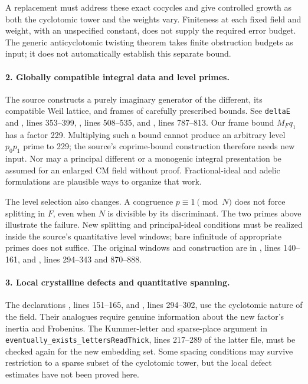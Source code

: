 A replacement must address these exact cocycles and give controlled
growth as both the cyclotomic tower and the weights vary. Finiteness
at each fixed field and weight, with an unspecified constant, does
not supply the required error budget. The generic anticyclotomic
twisting theorem takes finite obstruction budgets as input; it
does not automatically establish this separate bound.

\paragraph{2. Globally compatible integral data and level primes.}
The source constructs a purely imaginary generator of the different,
its compatible Weil lattice, and frames of carefully prescribed
bounds. See
\texttt{deltaE} and
,
lines 353--399,
,
lines 508--535, and
,
lines 787--813.
Our frame bound $M_Fq_1$ has a factor 229. Multiplying such a bound
cannot produce an arbitrary level $p_0p_1$ prime to 229; the source's
coprime-bound construction therefore needs new input. Nor may a
principal different or a monogenic integral presentation be assumed
for an enlarged CM field without proof. Fractional-ideal and adelic
formulations are plausible ways to organize that work.

The level selection also changes. A congruence $p\equiv1\pmod N$
does not force splitting in $F$, even when $N$ is divisible by its
discriminant. The two primes above illustrate the failure. New
splitting and principal-ideal conditions must be realized inside
the source's quantitative level windows; bare infinitude of
appropriate primes does not suffice. The original windows and
construction are in
, lines 140--161,
and ,
lines 294--343 and 870--888.

\paragraph{3. Local crystalline defects and quantitative spanning.}
The declarations
,
lines 151--165, and
,
lines 294--302, use the cyclotomic nature of the field. Their
analogues require genuine information about the new factor's
inertia and Frobenius. The Kummer-letter and sparse-place argument
in \texttt{eventually\_exists\_lettersReadThick}, lines 217--289 of
the latter file, must be checked again for the new embedding set.
Some spacing conditions may survive restriction to a sparse
subset of the cyclotomic tower, but the local defect estimates
have not been proved here.

